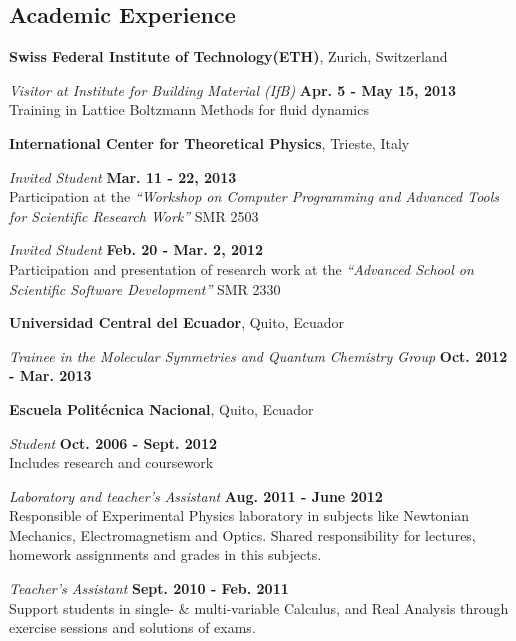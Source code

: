 \documentclass[margin,line]{res}
\newenvironment{list1}{
  \begin{list}{\ding{113}}{%
      \setlength{\itemsep}{0in}
      \setlength{\parsep}{0in} \setlength{\parskip}{0in}
      \setlength{\topsep}{0in} \setlength{\partopsep}{0in} 
      \setlength{\leftmargin}{0.17in}}}{\end{list}}
\begin{document}
\begin{resume}
\section{\sc Academic Experience}
  {\bf Swiss Federal Institute of Technology(ETH)}, Zurich, Switzerland
  \begin{list1}
    \item[] {\em Visitor at Institute for Building Material (IfB)} \hfill {\bf Apr. 5 - May 15, 2013}\\
    Training in Lattice Boltzmann Methods for fluid dynamics
  \end{list1}

  {\bf International Center for Theoretical Physics}, Trieste, Italy
  \begin{list1}
    \item[] {\em Invited Student} \hfill {\bf Mar. 11 - 22, 2013} \\
    Participation at the {\em ``Workshop on Computer Programming and Advanced Tools for Scientific
    Research Work''} SMR 2503
    \item[] {\em Invited Student} \hfill {\bf Feb. 20 - Mar. 2, 2012} \\
    Participation and presentation of research work at the {\em ``Advanced School on Scientific
    Software Development''} SMR 2330
  \end{list1}

  {\bf Universidad Central del Ecuador}, Quito, Ecuador
  \begin{list1}
    \item[] {\em Trainee in the Molecular Symmetries and Quantum Chemistry Group} \hfill {\bf Oct. 2012 - Mar. 2013}
  \end{list1}

  {\bf Escuela Politécnica Nacional}, Quito, Ecuador
  \begin{list1}
   \item[] {\em Student} \hfill {\bf Oct. 2006 - Sept. 2012}\\
    Includes research and coursework\\
   \item[] {\em Laboratory and teacher's Assistant} \hfill {\bf Aug. 2011 - June 2012}\\
    Responsible of Experimental Physics laboratory in subjects
    like Newtonian Mechanics, Electromagnetism and Optics.
    Shared responsibility for lectures, homework assignments and grades in this subjects.\\
   \item[] {\em Teacher's Assistant} \hfill {\bf Sept. 2010 - Feb. 2011}\\
    Support students in single- \& multi-variable Calculus, and Real Analysis through
    exercise sessions and solutions of exams.
  \end{list1}


\end{resume}
\end{document}
